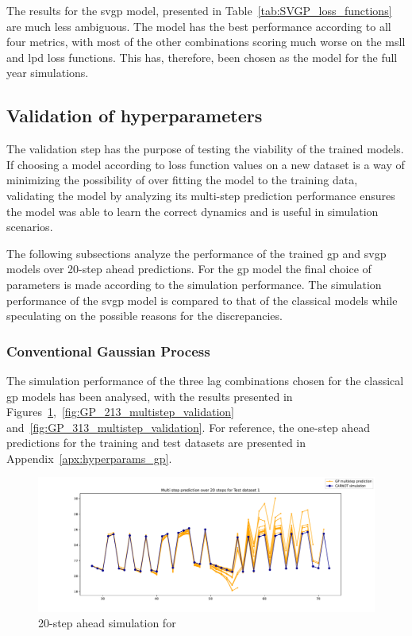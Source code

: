 The results for the \acrshort{svgp} model, presented in
Table~\ref{tab:SVGP_loss_functions} are much less ambiguous. The 
model has the best performance according to all four metrics, with most of the
other combinations scoring much worse on the \acrshort{msll} and \acrshort{lpd}
loss functions. This has, therefore, been chosen as the model for the full year
simulations.


\subsection{Validation of hyperparameters}\label{sec:validation_hyperparameters}

The validation step has the purpose of testing the viability of the trained
models. If choosing a model according to loss function values on a new dataset
is a way of minimizing the possibility of over fitting the model to the training
data, validating the model by analyzing its multi-step prediction performance
ensures the model was able to learn the correct dynamics and is useful in
simulation scenarios.

The following subsections analyze the performance of the trained \acrshort{gp}
and \acrshort{svgp} models over 20-step ahead predictions. For the \acrshort{gp}
model the final choice of parameters is made according to the simulation
performance. The simulation performance of the \acrshort{svgp} model is compared
to that of the classical models while speculating on the possible reasons for
the discrepancies.

\subsubsection{Conventional Gaussian Process}

The simulation performance of the three lag combinations chosen for the
classical \acrlong{gp} models has been analysed, with the results presented in
Figures~\ref{fig:GP_113_multistep_validation},~\ref{fig:GP_213_multistep_validation}
and~\ref{fig:GP_313_multistep_validation}. For reference, the one-step ahead
predictions for the training and test datasets are presented in
Appendix~\ref{apx:hyperparams_gp}.


\begin{figure}[ht]
    \centering
    \includegraphics[width =
    \textwidth]{Plots/GP_113_-1pts_test_prediction_20_steps.pdf}
    \vspace{-25pt}
    \caption{20-step ahead simulation for }
    \label{fig:GP_113_multistep_validation}
\end{figure}

